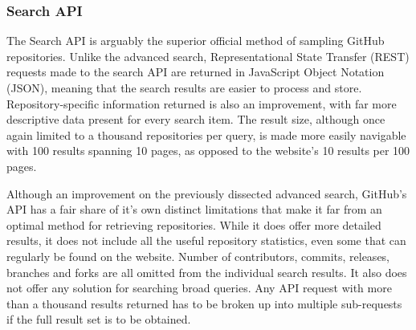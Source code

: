 \subsubsection{Search API}

The Search API is arguably the superior official method of sampling GitHub repositories.
Unlike the advanced search, Representational State Transfer (REST) requests made to the search API are returned in JavaScript Object Notation (JSON), meaning that the search results are easier to process and store.
Repository-specific information returned is also an improvement, with far more descriptive data present for every search item.
The result size, although once again limited to a thousand repositories per query, is made more easily navigable with 100 results spanning 10 pages, as opposed to the website's 10 results per 100 pages.

Although an improvement on the previously dissected advanced search, GitHub's API has a fair share of it's own distinct limitations that make it far from an optimal method for retrieving repositories.
While it does offer more detailed results, it does not include all the useful repository statistics, even some that can regularly be found on the website.
Number of contributors, commits, releases, branches and forks are all omitted from the individual search results.
It also does not offer any solution for searching broad queries.
Any API request with more than a thousand results returned has to be broken up into multiple sub-requests if the full result set is to be obtained.